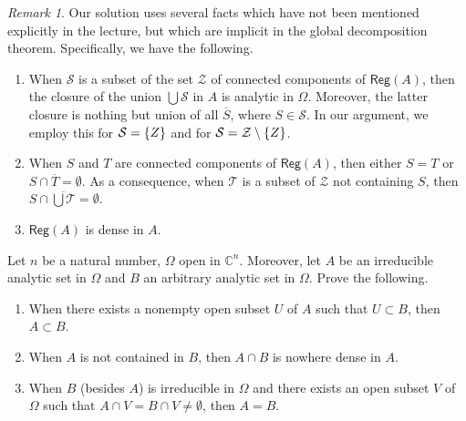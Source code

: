 \documentclass[a4paper]{amsart}
\newcommand{\C}{\mathbb{C}}
\newcommand{\Reg}[1]{\mathsf{Reg}(#1)}
\theoremstyle{remark}
\newtheorem{remark}{Remark}[question]
\numberwithin{equation}{question}
\DeclarePairedDelimiter\set{\{}{\}}
\begin{document}
\begin{solution}
\begin{remark}
Our solution uses several facts which have not been mentioned explicitly in the lecture, but which are implicit in the global decomposition theorem. Specifically, we have the following.
\begin{enumerate}[label=(\arabic*)]
\item When $\mathcal S$ is a subset of the set $\mathcal Z$ of connected components of $\Reg A$, then the closure of the union $\bigcup\mathcal S$ in $A$ is analytic in $\Omega$. Moreover, the latter closure is nothing but union of all $\overline S$, where $S \in \mathcal S$. In our argument, we employ this for $\mathcal S = \set Z$ and for $\mathcal S = \mathcal Z \setminus \set Z$.
\item When $S$ and $T$ are connected components of $\Reg A$, then either $S = T$ or $S \cap \overline T = \emptyset$. As a consequence, when $\mathcal T$ is a subset of $\mathcal Z$ not containing $S$, then $S \cap \overline{\bigcup\mathcal T} = \emptyset$.
\item $\Reg A$ is dense in $A$.
\end{enumerate}
\end{remark}
\end{solution}

\begin{question}[subtitle=The identity theorem for analytic sets (variations)]
\label{qu:identity theorem var}
Let $n$ be a natural number, $\Omega$ open in $\C^n$. Moreover, let $A$ be an irreducible analytic set in $\Omega$ and $B$ an arbitrary analytic set in $\Omega$. Prove the following.
\begin{enumerate}
\item \label{it:identity theorem var-a} When there exists a nonempty open subset $U$ of $A$ such that $U \subset B$, then $A \subset B$.
\item When $A$ is not contained in $B$, then $A \cap B$ is nowhere dense in $A$.
\item \label{it:identity theorem var-c} When $B$ (besides $A$) is irreducible in $\Omega$ and there exists an open subset $V$ of $\Omega$ such that $A \cap V = B \cap V \ne \emptyset$, then $A = B$.
\end{enumerate}
\end{question}
\end{document}
